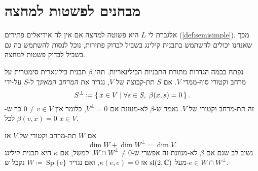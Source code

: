 \documentclass{report}
\theoremstyle{break}
\theoremstyle{MyNonumberbreak}
\DeclareMathOperator{\Sp}{Sp}
\begin{document}
\section{מבחנים לפשטות למחצה}
אלגברת לי $L$ היא פשוטה למחצה אם אין לה אידיאלים פתירים (\autoref*{def:semisimple}). מכך שאנחנו יכולים להשתמש בתבנית קילינג בשביל לבדוק פתירות, נוכל לנסות להשתמש בה גם בשביל לבדוק פשטות למחצה.

נפתח בכמה הגדרות מתורת התבניות הבילינאריות. תהי $\beta$ תבנית בילינארית סימטרית על מרחב וקטורי סוף-ממדי $V$. אם $S$ תת-קבוצה של $V$, נגדיר את \textit{המרחב המאונך} ל-$S$ על-ידי
\[ S^\perp \coloneqq \set{x \in V | \forall s \in S, \; \beta(x, s) = 0}. \]
זה תת-מרחב וקטורי של $V$. נאמר ש-$\beta$ לא-מנוונת אם $V^\perp = 0$, כלומר אין $0 \neq v \in V$ כך ש-$\beta(v, x) = 0$ לכל $x \in V$.

אם $W$ תת-מרחב וקטורי של $V$ אז
\[ \dim W + \dim W^\perp = \dim V. \]
נשיב לב שגם אם $\beta$ לא-מנוונת זה אפשרי ש-$W \cap W^\perp \neq 0$. למשל, אם $\kappa$ היא תבנית קילינג מעל $\operatorname{sl}(2, \operatorname{\mathbb{C}})$ אז $\kappa(e, e) = 0$, ואם נגדיר $W \coloneqq \Sp\{e\}$ נקבל ש-$e \in W \cap W^\perp$.
\end{document}
